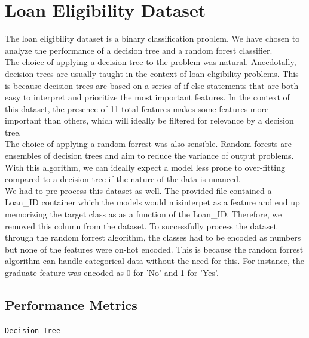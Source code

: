 \documentclass{article}
\begin{document}
\newpage
\section*{Loan Eligibility Dataset}
The loan eligibility dataset is a binary classification problem. We have chosen to analyze the performance of a decision tree and a random forest classifier.
\\

The choice of applying a decision tree to the problem was natural. Anecdotally, decision trees are usually taught in the context of loan eligibility problems. 
This is because decision trees are based on a series of if-else statements that are both easy to interpret and prioritize the most important features.
In the context of this dataset, the presence of 11 total features makes some features more important than others, which will ideally be filtered for relevance by a decision tree.
\\

The choice of applying a random forrest was also sensible. Random forests are ensembles of decision trees and aim to reduce the variance of output problems.
With this algorithm, we can ideally expect a model less prone to over-fitting compared to a decision tree if the nature of the data is nuanced.
\\

We had to pre-process this dataset as well. The provided file contained a Loan\_ID container which the models would misinterpet as a feature and end up memorizing the target class as
as a function of the Loan\_ID. Therefore, we removed this column from the dataset. To successfully process the dataset through the random forrest algorithm, the classes had to be encoded as numbers
but none of the features were on-hot encoded. This is because the random forrest algorithm can handle categorical data without the need for this. For instance, the graduate feature was encoded as 0 for 'No' and 1 for 'Yes'.


\subsection*{Performance Metrics}
\begin{center}
    \texttt{Decision Tree}
\end{center}
\end{document}
